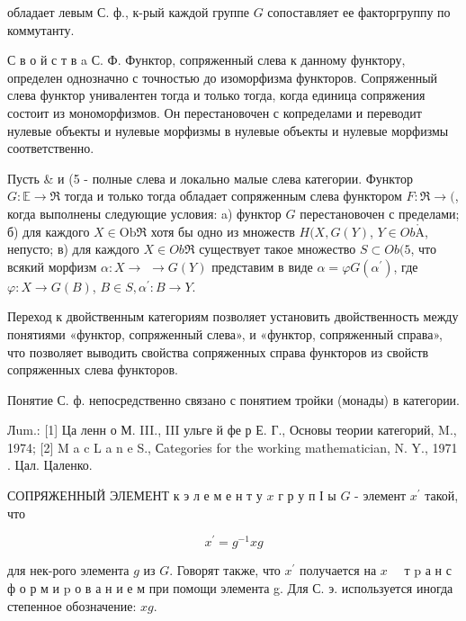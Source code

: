 \documentclass[10pt]{article}
\def\AA{\mathring{\mathrm{A}}}
\begin{document}
обладает левым С. ф., к-рый каждой группе $G$ сопоставляет ее факторгруппу по коммутанту.



С в о й с т в a С. Ф. Функтор, сопряженный слева к данному функтору, определен однозначно с точностью до изоморфизма функторов. Сопряженный слева функтор унивалентен тогда и только тогда, когда единица сопряжения состоит из мономорфизмов. Он перестановочен с копределами и переводит нулевые объекты и нулевые морфизмы в нулевые объекты и нулевые морфизмы соответственно.



Пусть \& и (5 - полные слева и локально малые слева категории. Функтор $G: \mathbb{E} \rightarrow \Re$ тогда и только тогда обладает сопряженным слева функтором $F: \Re \rightarrow($, когда выполнены следующие условия: a) функтор $G$ перестановочен с пределами; б) для каждого $X \in \mathrm{Ob} \mathfrak{\Re}$ хотя бы одно из множеств $H(X, G(Y)$, $Y \in O b \AA$, непусто; в) для каждого $X \in O b \mathfrak{R}$ существует такое множество $S \subset O b(5$, что всякий морфизм $\alpha: X \rightarrow$ $\rightarrow G(Y)$ представим в виде $\alpha=\varphi G\left(\alpha^{\prime}\right)$, где $\varphi: X \rightarrow G(B)$, $B \in S, \alpha^{\prime}: B \rightarrow Y$.



Переход к двойственным категориям позволяет установить двойственность между понятиями «функтор, сопряженный слева», и «функтор, сопряженный справа», что позволяет выводить свойства сопряженных справа функторов из свойств сопряженных слева функторов.



Понятие С. ф. непосредственно связано с понятием тройки (монады) в категории.



Лum.: [1] Ца ленн о М. III., III ульге й фе р Е. Г., Основы теории категорий, M., 1974; [2] M a c L a n e S., Сategories for the working mathematician, N. Y., 1971 . Цал. Цаленко.



СОПРЯЖЕННЫЙ ЭЛЕМЕНТ к э л е м е н т у $x$ г р у п І ы $G$ - элемент $x^{\prime}$ такой, что



\[

x^{\prime}=g^{-1} x g

\]



для нек-рого элемента $g$ из $G$. Говорят также, что $x^{\prime}$ получается на $x \quad$ т $\mathrm{p}$ а н с ф о р м и $\mathrm{p}$ о в а н и е м при помощи элемента g. Для С. э. используется иногда степенное обозначение: $x g$.
\end{document}
